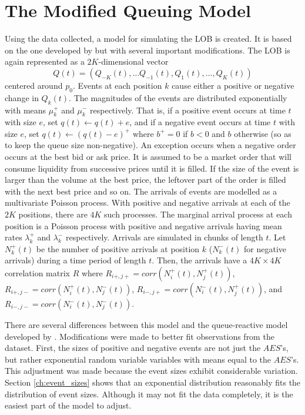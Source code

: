 \section{The Modified Queuing Model}\label{ch:queue_model}
Using the data collected, a model for simulating the LOB is created. It is based on the one developed by \cite{A6} but with several important modifications. The LOB is again represented as a $2K$-dimensional vector $$Q(t) = (Q_{-K}(t), \ldots Q_{-1}(t), Q_1(t), \ldots , Q_K(t))$$ centered around $p_0$. Events at each position $k$ cause either a positive or negative change in $Q_k(t)$. The magnitudes of the events are distributed exponentially with means $\mu^+_k$ and $\mu^-_k$ respectively. That is, if a positive event occurs at time $t$ with size $e$, set $q(t) \leftarrow q(t) + e$, and if a negative event occurs at time $t$ with size $e$, set $q(t) \leftarrow (q(t) - e)^+$ where $b^+ = 0$ if $b < 0$ and $b$ otherwise (so as to keep the queue size non-negative). An exception occurs when a negative order occurs at the best bid or ask price. It is assumed to be a market order that will consume liquidity from successive prices until it is filled. If the size of the event is larger than the volume at the best price, the leftover part of the order is filled with the next best price and so on. The arrivals of events are modelled as a multivariate Poisson process. With positive and negative arrivals at each of the $2K$ positions, there are $4K$ such processes. The marginal arrival process at each position is a Poisson process with positive and negative arrivals having mean rates $\lambda^+_k$ and $\lambda^-_k$ respectively. Arrivals are simulated in chunks of length $t$. Let $N^+_k(t)$ be the number of positive arrivals at position $k$ ($N^-_k(t)$ for negative arrivals) during a time period of length $t$. Then, the arrivals have a $4K\times4K$ correlation matrix $R$ where $R_{i+,j+} = corr(N^+_i(t), N^+_j(t))$, $R_{i+,j-} = corr(N^+_i(t), N^-_j(t))$, $R_{i-,j+} = corr(N^-_i(t), N^+_j(t))$, and $R_{i-,j-} = corr(N^-_i(t), N^-_j(t))$.

There are several differences between this model and the queue-reactive model developed by \cite{A6}. Modifications were made to better fit observations from the dataset. First, the sizes of positive and negative events are not just the $AES$'s, but rather exponential random variable variables with means equal to the $AES$'s. This adjustment was made because the event sizes exhibit considerable variation. Section \ref{ch:event_sizes} shows that an exponential distribution reasonably fits the distribution of event sizes. Although it may not fit the data completely, it is the easiest part of the model to adjust.


